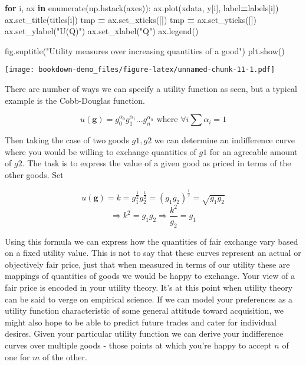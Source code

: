 \documentclass[
]{book}
\newenvironment{Shaded}{\begin{snugshade}}{\end{snugshade}}
\newcommand{\BuiltInTok}[1]{#1}
\newcommand{\ControlFlowTok}[1]{\textcolor[rgb]{0.13,0.29,0.53}{\textbf{#1}}}
\newcommand{\KeywordTok}[1]{\textcolor[rgb]{0.13,0.29,0.53}{\textbf{#1}}}
\newcommand{\NormalTok}[1]{#1}
\newcommand{\OperatorTok}[1]{\textcolor[rgb]{0.81,0.36,0.00}{\textbf{#1}}}
\newcommand{\StringTok}[1]{\textcolor[rgb]{0.31,0.60,0.02}{#1}}
\theoremstyle{definition}
\theoremstyle{definition}
\theoremstyle{definition}
\theoremstyle{remark}
\begin{document}
\begin{Shaded}
\begin{Highlighting}[]
\ControlFlowTok{for}\NormalTok{ i, ax }\KeywordTok{in} \BuiltInTok{enumerate}\NormalTok{(np.hstack(axes)):}
\NormalTok{    ax.plot(xdata, y[i], label}\OperatorTok{=}\NormalTok{labels[i])}
\NormalTok{    ax.set\_title(titles[i])}
\NormalTok{    tmp }\OperatorTok{=}\NormalTok{ ax.set\_xticks([])}
\NormalTok{    tmp }\OperatorTok{=}\NormalTok{ ax.set\_yticks([])}
\NormalTok{    ax.set\_ylabel(}\StringTok{"U(Q)"}\NormalTok{)}
\NormalTok{    ax.set\_xlabel(}\StringTok{"Q"}\NormalTok{)}
\NormalTok{    ax.legend()}
    
\NormalTok{fig.suptitle(}\StringTok{"Utility measures over increasing quantities of a good"}\NormalTok{)}
\NormalTok{plt.show()}
\end{Highlighting}
\end{Shaded}

\texttt{[image: bookdown-demo\_files/figure-latex/unnamed-chunk-11-1.pdf]}

There are number of ways we can specify a utility function as seen, but a typical example is the Cobb-Douglas function.

\[ u(\mathbf{g}) = g_{0}^{\alpha_{0}}g_{1}^{\alpha_{1}} ... g_{n}^{\alpha_{n}} \text{ where } \forall i \sum \alpha_i = 1\]

Then taking the case of two goods \(g1, g2\) we can determine an indifference curve where you would be willing to exchange quantities of \(g1\) for an agreeable amount of \(g2\). The task is to express the value of a given good as priced in terms of the other goods. Set

\[u(\mathbf{g}) = k =  g_{1}^{\frac{1}{2}}g_{2}^{\frac{1}{2}} = (g_{1}g_{2})^{\frac{1}{2}}  = \sqrt{g_{1}g_{2}}\] \[ \Rightarrow k^{2} = g_{1}g_{2} \Rightarrow \frac{k^{2}}{g_{2}} = g_{1}\]

Using this formula we can express how the quantities of fair exchange vary based on a fixed utility value. This is not to say that these curves represent an actual or objectively fair price, just that when measured in terms of our utility these are mappings of quantities of goods we would be happy to exchange. Your view of a fair price is encoded in your utility theory. It's at this point when utility theory can be said to verge on empirical science. If we can model your preferences as a utility function characteristic of some general attitude toward acquisition, we might also hope to be able to predict future trades and cater for individual desires. Given your particular utility function we can derive your indifference curves over multiple goods - those points at which you're happy to accept \(n\) of one for \(m\) of the other.
\end{document}
